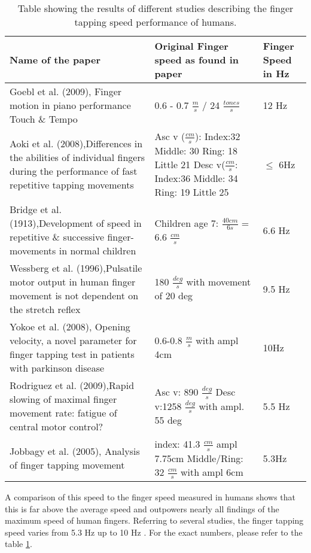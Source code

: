 \documentclass[main]{subfiles}
\begin{document}
\begin{table}[H]
\begin{adjustwidth}{-3em}{-3em}
\scriptsize 
\begin{tabular}{p{8cm}|p{5.5cm}|l}
\toprule
Name of the paper & Original Finger speed as found in paper & Finger Speed in Hz\\ 
\midrule
	Goebl et al. (2009), Finger motion in piano performance Touch \& Tempo \cite{Goebl2009} &  0.6 - 0.7 $\frac{m}{s}$ / 24 $\frac{tones}{s}$ & 12 Hz\\
	Aoki et al. (2008),Differences in the abilities of individual fingers during the performance of fast repetitive tapping movements \cite{Aoki2008} & Asc v ($\frac{cm}{s}$): Index:32 Middle: 30 Ring: 18 Little 21 \newline Desc v($\frac{cm}{s}$: Index:36 Middle: 34 Ring: 19 Little 25 & $\leq$ 6Hz \\
	Bridge et al. (1913),Development of speed in repetitive \& successive finger-movements in normal children \cite{BridgeDenckla1913} & Children age 7: $\frac{40cm}{6s}$ = 6.6 $\frac{cm}{s}$ & 6.6 Hz \\
	Wessberg et al. (1996),Pulsatile motor output in human finger movement is not dependent on the stretch reflex \cite{Wessberg1996} & 180 $\frac{deg}{s}$ with movement of 20 deg & 9.5 Hz\\
	Yokoe et al. (2008), Opening velocity, a novel parameter for finger tapping test in patients with parkinson disease \cite{Yokoe2008} & 0.6-0.8 $\frac{m}{s}$ with ampl 4cm & 10Hz \\
	Rodriguez et al. (2009),Rapid slowing of maximal finger movement rate: fatigue of central motor control? \cite{Rodrigues2009} & Asc v: 890 $\frac{deg}{s}$ \newline Desc v:1258 $\frac{deg}{s}$ with ampl. 55 deg & 5.5 Hz  \\
	Jobbagy et al. (2005), Analysis of finger tapping movement \cite{Jobbagy2005} & index: 41.3 $\frac{cm}{s}$ ampl 7.75cm \newline Middle/Ring: 32 $\frac{cm}{s}$ with ampl 6cm & 5.3Hz \\
\bottomrule
\end{tabular}
\caption[Finger tapping speed]{Table showing the results of different studies describing the finger tapping speed performance of humans.}
\label{finger-tapping}
\normalsize
\end{adjustwidth}
\end{table}
A comparison of this speed to the finger speed measured in humans shows that this is far above the average speed and  outpowers nearly all findings of the maximum speed of human fingers. Referring to several studies, the finger tapping speed varies from 5.3 Hz \cite{Jobbagy2005} up to 10 Hz \cite{Yokoe2008}. For the exact numbers, please refer to the table \ref{finger-tapping}.
\end{document}
